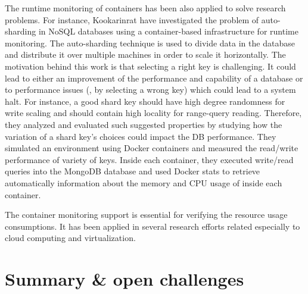 The runtime monitoring of containers has been also applied to solve research problems. For instance, Kookarinrat \etal\cite{kookarinrat2015analysis} have investigated the problem of auto-sharding in NoSQL databases using a container-based infrastructure for runtime monitoring. 
The auto-sharding technique is used to divide data in the database and distribute it over multiple machines in order to scale it horizontally. The motivation behind this work is that selecting a right key is challenging. It could lead to either an improvement of the performance and capability of a database or to performance issues (\ie, by selecting a wrong key) which could lead to a system halt. 
For instance, a good shard key should have high degree randomness for write scaling and should contain high locality for range-query reading.
Therefore, they analyzed and evaluated such suggested properties by studying how the variation of a shard key’s choices could impact the DB performance.
They simulated an environment using Docker containers and measured the read/write performance of variety of keys. Inside each container, they executed write/read queries into the MongoDB database and used Docker stats to retrieve automatically information about the memory and CPU usage of inside each container.



The container monitoring support is essential for verifying the resource usage consumptions. It has been applied in several research efforts related especially to cloud computing and virtualization\cite{peinl2016docker,medel2016modelling}.
\section{Summary \& open challenges}
\label{sec:suumary SOTA}

